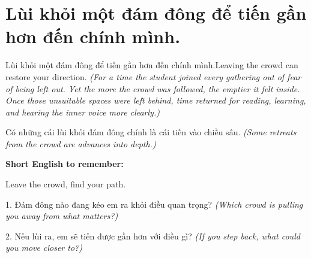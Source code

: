 \section{Lùi khỏi một đám đông để tiến gần hơn đến chính mình.}
\begin{truyen}{Lùi khỏi một đám đông để tiến gần hơn đến chính mình.}{Leaving the crowd can restore your direction.}
\textit{(For a time the student joined every gathering out of fear of being left out. Yet the more the crowd was followed, the emptier it felt inside. Once those unsuitable spaces were left behind, time returned for reading, learning, and hearing the inner voice more clearly.)}
\end{truyen}
\begin{baihoc}
Có những cái lùi khỏi đám đông chính là cái tiến vào chiều sâu.
\textit{(Some retreats from the crowd are advances into depth.)}
\end{baihoc}
\begin{ghinhoanh}
\textbf{Short English to remember:}

Leave the crowd, find your path.
\end{ghinhoanh}
\begin{tuhocnhanh}
1. Đám đông nào đang kéo em ra khỏi điều quan trọng? \textit{(Which crowd is pulling you away from what matters?)}

2. Nếu lùi ra, em sẽ tiến được gần hơn với điều gì? \textit{(If you step back, what could you move closer to?)}
\end{tuhocnhanh}
\ngancach

